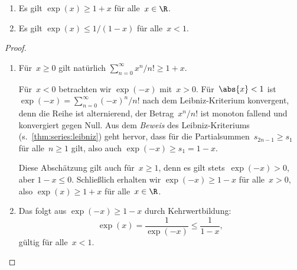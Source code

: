 \documentclass[a4paper]{article}
\begin{document}
\begin{proposition}\label{prop:exponential:estimate}\leavevmode
    \begin{enumerate}
        \item Es gilt $\exp(x) \geq 1+x$ für alle~$x \in \R$.
        \item Es gilt $\exp(x) \leq 1/(1-x)$ für alle~$x < 1$.
    \end{enumerate}
\end{proposition}

\begin{proof}\leavevmode
    \begin{enumerate}
        \item Für~$x \geq 0$ gilt natürlich $\sum_{n=0}^\infty x^n/n! \geq 1+x$.

              Für~$x < 0$ betrachten wir $\exp(-x)$ mit~$x > 0$. Für~$\abs{x} < 1$ ist $\exp(-x) = \sum_{n=0}^\infty (-x)^n/n!$ nach dem Leibniz-Kriterium konvergent, denn die Reihe ist alternierend, der Betrag~$x^n/n!$ ist monoton fallend und konvergiert gegen Null. Aus dem \emph{Beweis} des Leibniz-Kriteriums (s.~\cref{thm:series:leibniz}) geht hervor, dass für die Partialsummen~$s_{2n-1} \geq s_1$ für alle~$n \geq 1$ gilt, also auch $\exp(-x) \geq s_1 = 1-x$.

              Diese Abschätzung gilt auch für~$x \geq 1$, denn es gilt stets~$\exp(-x) > 0$, aber $1-x \leq 0$. Schließlich erhalten wir $\exp(-x) \geq 1-x$ für alle~$x > 0$, also $\exp(x) \geq 1+x$ für alle~$x \in \R$.
        \item Das folgt aus $\exp(-x) \geq 1-x$ durch Kehrwertbildung:
              \begin{equation*}
                  \exp(x) = \frac{1}{\exp(-x)} \leq \frac{1}{1-x},
              \end{equation*}
              gültig für alle~$x < 1$.\qedhere
    \end{enumerate}
\end{proof}

\begin{center}
\end{center}
\end{document}
